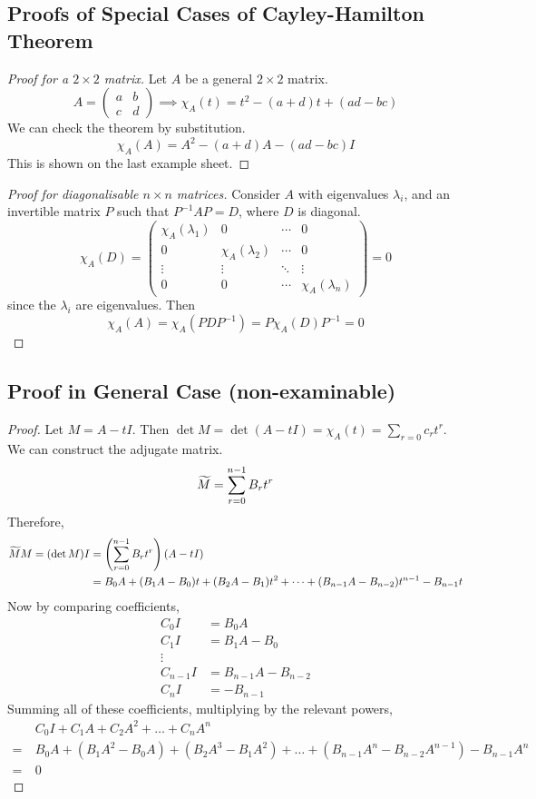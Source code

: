 \documentclass{article}
\begin{document}
	\subsection{Proofs of Special Cases of Cayley-Hamilton Theorem}
	\begin{proof}[Proof for a $2\times 2$ matrix]
		Let $A$ be a general $2\times 2$ matrix.
		\[ A = \begin{pmatrix}
			a & b \\ c & d
		\end{pmatrix} \implies \chi_A(t) = t^2 - (a+d)t + (ad-bc) \]
		We can check the theorem by substitution.
		\[ \chi_A(A) = A^2 - (a+d)A - (ad-bc)I \]
		This is shown on the last example sheet.
	\end{proof}
	\begin{proof}[Proof for diagonalisable $n \times n$ matrices]
		Consider $A$ with eigenvalues $\lambda_i$, and an invertible matrix $P$ such that $P^{-1}AP = D$, where $D$ is diagonal.
		\[ \chi_A(D) = \begin{pmatrix}
			\chi_A(\lambda_1) & 0 & \cdots & 0 \\
			0 & \chi_A(\lambda_2) & \cdots & 0 \\
			\vdots & \vdots & \ddots & \vdots \\
			0 & 0 & \cdots & \chi_A(\lambda_n)
		\end{pmatrix} = 0 \]
		since the $\lambda_i$ are eigenvalues. Then
		\[ \chi_A(A) = \chi_A(PDP^{-1}) = P\chi_A(D)P^{-1} = 0 \]
	\end{proof}

	\subsection{Proof in General Case (non-examinable)}
	\begin{proof}
		Let $M = A - tI$. Then $\det M = \det(A - tI) = \chi_A(t) = \sum_{r=0}c_rt^r$. We can construct the adjugate matrix.
		\[ \widetilde{M} = \sum_{r=0}^{n-1} B_rt^r \]
		Therefore,
		\begin{align*}
			\widetilde{M} M = (\det M) I &= \left(\sum_{r=0}^{n-1} B_rt^r\right)(A-tI) \\
			&= B_0A + (B_1A - B_0)t + (B_2A - B_1)t^2 + \dots + (B_{n-1}A - B_{n-2})t^{n-1} - B_{n-1}t
		\end{align*}
		Now by comparing coefficients,
		\begin{align*}
			C_0I &= B_0A \\
			C_1I &= B_1A - B_0 \\
			\vdots \\
			C_{n-1}I &= B_{n-1}A - B_{n-2} \\
			C_nI &= -B_{n-1}
		\end{align*}
		Summing all of these coefficients, multiplying by the relevant powers,
		\begin{align*}
			&C_0I + C_1A + C_2A^2 + \dots + C_nA^n \\=\ &B_0A + (B_1A^2 - B_0A) + (B_2A^3 - B_1A^2) + \dots + (B_{n-1}A^n - B_{n-2}A^{n-1}) - B_{n-1}A^n \\=\ &0
		\end{align*}
	\end{proof}
\end{document}
